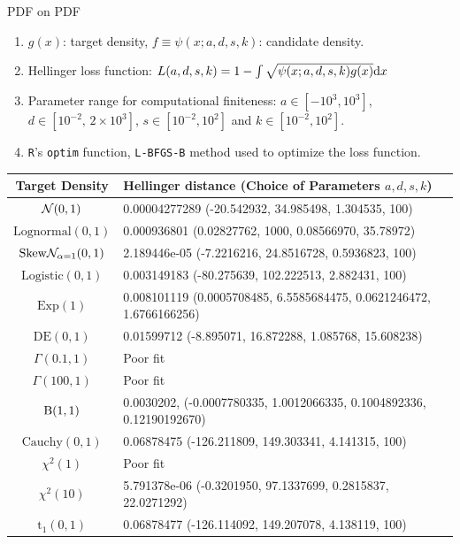 \documentclass{beamer}
\begin{document}
\begin{frame}[allowframebreaks]{PDF on PDF}
	\begin{enumerate}
		\item $g(x)$: target density, $f \equiv \psi(x;a,d,s,k)$: candidate density.
		\item Hellinger loss function: $L(a,d,s,k) = 1 - \int \sqrt{\psi(x;a,d,s,k)g(x)} \mathrm d x$
		\item Parameter range for computational finiteness:  $a \in [-10^3, 10^3]$, $d \in [10^{-2}, \, 2\times10^3]$, $s \in [10^{-2}, 10^2]$ and $k \in [10^{-2}, 10^2]$.
		\item \texttt{R}'s \texttt{optim} function, \texttt{L-BFGS-B} method used to optimize the loss function.
	\end{enumerate}
	
	\scriptsize
	\begin{table}
		\centering
		\begin{tabularx}{\linewidth}{c|X}
			Target Density & Hellinger distance (Choice of Parameters $a,d,s,k$)\\
			\hline
			$\mathcal{N}(0,1)$ & 0.00004277289 (-20.542932, 34.985498, 1.304535, 100)\\
			$\mathrm{Lognormal}(0,1)$ & 0.000936801 (0.02827762, 1000, 0.08566970, 35.78972) \\
			$\mathrm{Skew}\mathcal{N}_{\alpha=1} (0,1)$ & 2.189446e-05 (-7.2216216, 24.8516728, 0.5936823, 100) \\
			\hline
			$\mathrm{Logistic}(0,1)$ & 0.003149183 (-80.275639, 102.222513, 2.882431, 100) \\
			$\mathrm{Exp}(1)$ & 0.008101119 (0.0005708485, 6.5585684475, 0.0621246472, 1.6766166256) \\
			$\mathrm{DE}(0,1)$ & 0.01599712 (-8.895071, 16.872288, 1.085768, 15.608238) \\
			\hline
			$\Gamma(0.1,1)$ & Poor fit \\
			$\Gamma(100,1)$ & Poor fit \\
			$\mathrm B(1,1)$ & 0.0030202, (-0.0007780335, 1.0012066335, 0.1004892336, 0.12190192670) \\
			\hline
			$\mathrm{Cauchy}(0,1)$ & 0.06878475 (-126.211809, 149.303341, 4.141315, 100) \\
			\hline
			$\chi^2(1)$ & Poor fit \\
			$\chi^2(10)$ & 5.791378e-06 (-0.3201950, 97.1337699, 0.2815837, 22.0271292) \\
			$\mathrm{t}_1(0,1)$ & 0.06878477 (-126.114092, 149.207078, 4.138119, 100) \\

\end{tabularx}
\end{table}
\end{frame}
\end{document}
